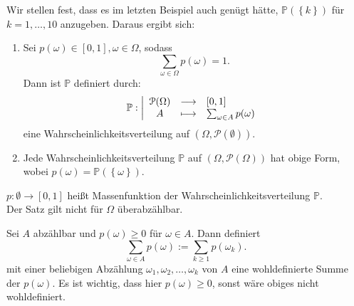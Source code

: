 Wir stellen fest, dass es im letzten Beispiel auch genügt hätte, $\mathbb{P}(\left \{k\right\} )$ für $k=1,\ldots,10$ anzugeben. Daraus ergibt sich:
\begin{theorem}\label{thm:wahrscheinlichkeitsverteilungen-auf-abzaehlbaren-raeumen}
    \begin{enumerate}[label=\protect\circled{\alph*}]
        Sei $\Omega$ abzählbar.
        \item Sei $p(\omega)\in [0,1], \omega\in \Omega$, sodass
            \[
                \sum_{\omega\in \Omega}p(\omega) = 1
            .\] 
            Dann ist $\mathbb{P}$ definiert durch:
                \begin{equation*}
                \mathbb{P}: \left| \begin{array}{c c l} 
                    \mathcal{P}(\Omega) & \longrightarrow & [0,1] \\
                    A & \longmapsto &  \sum_{\omega\in A}p(\omega)
                \end{array} \right.
            \end{equation*}
            eine Wahrscheinlichkeitsverteilung auf $(\Omega,\mathcal{P}(\emptyset))$. 
        \item Jede Wahrscheinlichkeitsverteilung $\mathbb{P}$ auf $(\Omega,\mathcal{P}(\Omega))$ hat obige Form, wobei $p(\omega) = \mathbb{P}(\left \{\omega\right\} )$.
    \end{enumerate}
\end{theorem}

\begin{remark}
    $p:\emptyset\to [0,1]$ heißt Massenfunktion der Wahrscheinlichkeitsverteilung $\mathbb{P}$. \\
    \warning Der Satz gilt nicht für $\Omega$ überabzählbar.
\end{remark}


\begin{remark}
    Sei $A$ abzählbar und  $p(\omega) \geq 0$ für $\omega\in A$. Dann definiert
    \[
        \sum_{\omega\in A} p(\omega) := \sum_{k\geq 1} p(\omega_k)
    .\] 
    mit einer beliebigen Abzählung $\omega_1,\omega_2, \ldots, \omega_k$ von $A$ eine wohldefinierte Summe der  $p(\omega)$. Es ist wichtig, dass hier $p(\omega) \geq 0$, sonst wäre obiges nicht wohldefiniert.
\end{remark}

